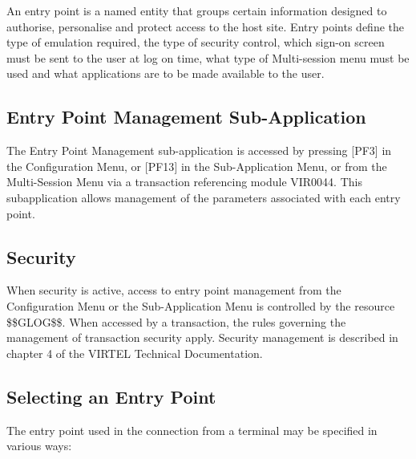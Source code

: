 \documentclass[letterpaper,10pt,english]{sphinxmanual}
\begin{document}
An entry point is a named entity that groups certain information designed to authorise, personalise and protect access to the host site. Entry points define the type of emulation required, the type of security control, which sign-on screen must be sent to the user at log on time, what type of Multi-session menu must be used and what applications are to be made available to the user.


\subsection{Entry Point Management Sub-Application}
\label{\detokenize{connectivity_guide:index-103}}\label{\detokenize{connectivity_guide:entry-point-management-sub-application}}
The Entry Point Management sub-application is accessed by pressing {[}PF3{]} in the Configuration Menu, or {[}PF13{]} in the Sub-Application Menu, or from the Multi-Session Menu via a transaction referencing module VIR0044. This subapplication allows management of the parameters associated with each entry point.


\subsection{Security}
\label{\detokenize{connectivity_guide:id55}}\label{\detokenize{connectivity_guide:index-104}}
When security is active, access to entry point management from the Configuration Menu or the Sub-Application Menu is controlled by the resource \$\$GLOG\$\$. When accessed by a transaction, the rules governing the management of transaction security apply. Security management is described in chapter 4 of the VIRTEL Technical Documentation.


\subsection{Selecting an Entry Point}
\label{\detokenize{connectivity_guide:selecting-an-entry-point}}\label{\detokenize{connectivity_guide:index-105}}
The entry point used in the connection from a terminal may be specified in various ways:
\end{document}
